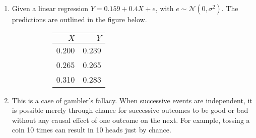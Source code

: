 \begin{enumerate}
\begin{enumerate}
\begin{figure}[H]
	\end{figure}

\end{enumerate}

\item Given a linear regression $ Y = 0.159 + 0.4X + e $, with $ e \sim \mathcal{N}(0, \sigma^2) $. The predictions are outlined in the figure below.

\begin{figure}[H]
	\begin{subfigure}[]{0.2\linewidth}
		\centering
		\begin{tabular}{@{}rr@{}}
			\toprule
			$X$     &    $ Y $ \\
			\midrule
			  0.200  &  0.239    \\
			 0.265	&  0.265   \\
			  0.310  &  0.283  \\
			\bottomrule
		\end{tabular}
		
	\end{subfigure}
	\begin{subfigure}[]{0.8\linewidth}
		\centering
		
	\end{subfigure}
\end{figure}

\item This is a case of gambler's fallacy. When successive events are independent, it is possible merely through chance for successive outcomes to be good or bad without any causal effect of one outcome on the next. For example, tossing a coin 10 times can result in 10 heads just by chance.


\end{enumerate}
